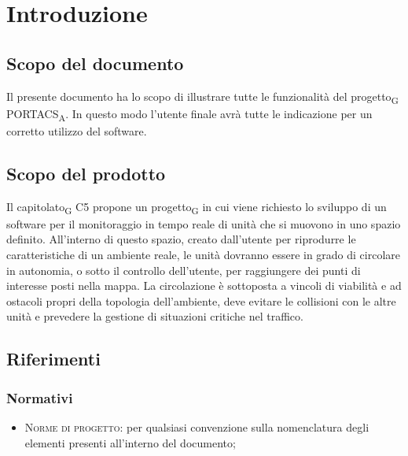\section{Introduzione}
\subsection{Scopo del documento}
    Il presente documento ha lo scopo di illustrare tutte le funzionalità del progetto\textsubscript{G} PORTACS\textsubscript{A}. In questo modo l'utente finale avrà tutte le indicazione per un corretto utilizzo del software.


\subsection{Scopo del prodotto}

    Il capitolato\textsubscript{G} C5 propone un progetto\textsubscript{G} in cui viene richiesto lo sviluppo di un software per il monitoraggio in tempo reale di unità che si muovono in uno spazio definito. All'interno di questo spazio, creato dall'utente per riprodurre le caratteristiche di un ambiente reale, le unità dovranno essere in grado di circolare in autonomia, o sotto il controllo dell'utente, per raggiungere dei punti di interesse posti nella mappa.  La circolazione è sottoposta a vincoli di viabilità e ad ostacoli propri della topologia dell'ambiente, deve evitare le collisioni con le altre unità e prevedere la gestione di situazioni critiche nel traffico.

\subsection{Riferimenti}
\label{ref}
    \subsubsection{Normativi}
    \begin{itemize}
    	\item \textsc{Norme di progetto}: per qualsiasi convenzione sulla nomenclatura degli elementi presenti all'interno del documento;
    	
    \end{itemize}


